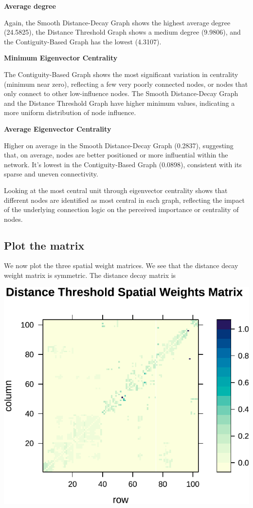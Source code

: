 \documentclass[
  a4paper,
]{article}
\begin{document}
\textbf{Average degree}

Again, the Smooth Distance-Decay Graph shows the highest average degree
(24.5825), the Distance Threshold Graph shows a medium degree (9.9806),
and the Contiguity-Based Graph has the lowest (4.3107).

\textbf{Minimum Eigenvector Centrality}

The Contiguity-Based Graph shows the most significant variation in
centrality (minimum near zero), reflecting a few very poorly connected
nodes, or nodes that only connect to other low-influence nodes. The
Smooth Distance-Decay Graph and the Distance Threshold Graph have higher
minimum values, indicating a more uniform distribution of node
influence.

\textbf{Average Eigenvector Centrality}

Higher on average in the Smooth Distance-Decay Graph (0.2837),
suggesting that, on average, nodes are better positioned or more
influential within the network. It's lowest in the Contiguity-Based
Graph (0.0898), consistent with its sparse and uneven connectivity.

Looking at the most central unit through eigenvector centrality shows
that different nodes are identified as most central in each graph,
reflecting the impact of the underlying connection logic on the
perceived importance or centrality of nodes.

\hypertarget{plot-the-matrix}{%
\subsection{Plot the matrix}\label{plot-the-matrix}}

We now plot the three spatial weight matrices. We see that the distance
decay weight matrix is symmetric. The distance decay matrix is

\begin{center}\includegraphics{02_assignmnet_files/figure-latex/unnamed-chunk-8-1} \end{center}
\end{document}
